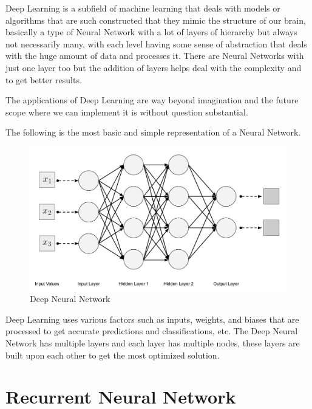 \documentclass[oneside,12pt]{Classes/RoboticsLaTeX}
\begin{document}
Deep Learning is a subfield of machine learning that deals with models or algorithms that are such constructed that they mimic the structure of our brain, basically a type of Neural Network with a lot of layers of hierarchy but always not necessarily many, with each level having some sense of abstraction that deals with the huge amount of data and processes it. There are Neural Networks with just one layer too but the addition of layers helps deal with the complexity and to get better results.

The applications of Deep Learning are way beyond imagination and the future scope where we can implement it is without question substantial.

The following is the most basic and simple representation of a Neural Network.

\begin{figure}[H]
  \centering
  \includegraphics[width=0.80\linewidth]{Figures/dnn.png}
  \caption{Deep Neural Network}
  \label{fig:dnn}
\end{figure}

Deep Learning uses various factors such as inputs, weights, and biases that are processed to get accurate predictions and classifications, etc. The Deep Neural Network has multiple layers and each layer has multiple nodes, these layers are built upon each other to get the most optimized solution.

\section{Recurrent Neural Network}
\end{document}
